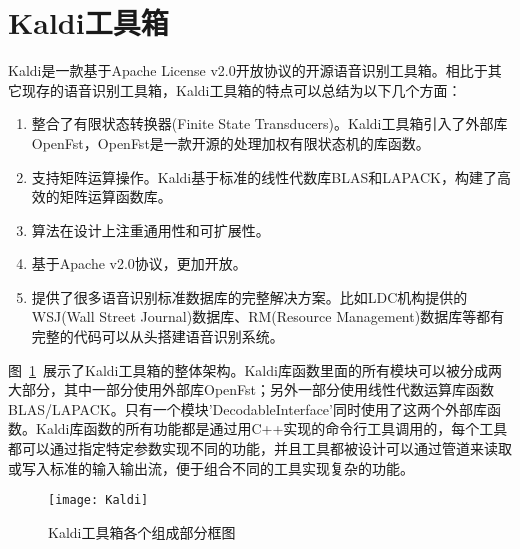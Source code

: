 \section{Kaldi工具箱}
Kaldi是一款基于Apache License v2.0开放协议的开源语音识别工具箱。相比于其它现存的语音识别工具箱，Kaldi工具箱的特点可以总结为以下几个方面：
\begin{enumerate}
  \item 整合了有限状态转换器(Finite State Transducers)。Kaldi工具箱引入了外部库OpenFst\cite{allauzen2007openfst}，OpenFst是一款开源的处理加权有限状态机的库函数。
  \item 支持矩阵运算操作。Kaldi基于标准的线性代数库BLAS和LAPACK，构建了高效的矩阵运算函数库。
  \item 算法在设计上注重通用性和可扩展性。
  \item 基于Apache v2.0协议，更加开放。
  \item 提供了很多语音识别标准数据库的完整解决方案。比如LDC机构提供的WSJ(Wall Street Journal)数据库、RM(Resource Management)数据库等都有完整的代码可以从头搭建语音识别系统。
\end{enumerate}

图~\ref{fig:Kaldi}~展示了Kaldi工具箱的整体架构。Kaldi库函数里面的所有模块可以被分成两大部分，其中一部分使用外部库OpenFst；另外一部分使用线性代数运算库函数BLAS/LAPACK。只有一个模块'DecodableInterface'同时使用了这两个外部库函数。Kaldi库函数的所有功能都是通过用C++实现的命令行工具调用的，每个工具都可以通过指定特定参数实现不同的功能，并且工具都被设计可以通过管道来读取或写入标准的输入输出流，便于组合不同的工具实现复杂的功能。
\begin{figure}[htbp]
\centering
\texttt{[image: Kaldi]}
\caption{Kaldi工具箱各个组成部分框图}\label{fig:Kaldi}
\vspace{\baselineskip}
\end{figure}

